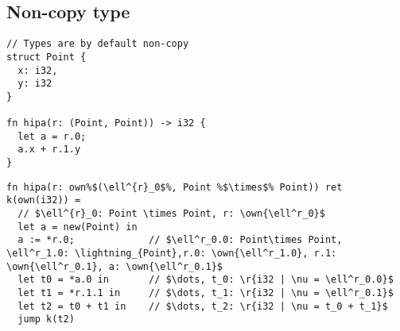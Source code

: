 \documentclass{article}
\newcommand{\own}[1]{\mathbf{own}\left(#1\right)}
\begin{document}
\clearpage
\subsection{Non-copy type}
\begin{verbatim}
// Types are by default non-copy
struct Point {
  x: i32,
  y: i32
}

fn hipa(r: (Point, Point)) -> i32 {
  let a = r.0;
  a.x + r.1.y
}
\end{verbatim}

\begin{verbatim}
fn hipa(r: own%$(\ell^{r}_0$%, Point %$\times$% Point)) ret k(own(i32)) =
  // $\ell^{r}_0: Point \times Point, r: \own{\ell^r_0}$
  let a = new(Point) in
  a := *r.0;             // $\ell^r_0.0: Point\times Point, \ell^r_1.0: \lightning_{Point},r.0: \own{\ell^r_1.0}, r.1: \own{\ell^r_0.1}, a: \own{\ell^r_0.1}$
  let t0 = *a.0 in       // $\dots, t_0: \r{i32 | \nu = \ell^r_0.0}$
  let t1 = *r.1.1 in     // $\dots, t_1: \r{i32 | \nu = \ell^r_0.1}$
  let t2 = t0 + t1 in    // $\dots, t_2: \r{i32 | \nu = t_0 + t_1}$
  jump k(t2)
\end{verbatim}
\end{document}
